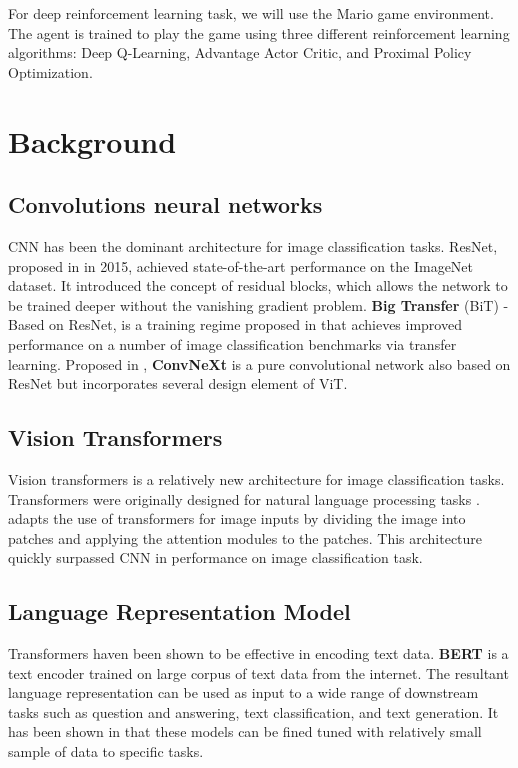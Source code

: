 \documentclass[conference]{IEEEtran}
\begin{document}
For deep reinforcement learning task, we will use the Mario game environment. The agent is trained to play the game using three different reinforcement learning algorithms: Deep Q-Learning, Advantage Actor Critic, and Proximal Policy Optimization.

\section{Background}

\subsection{Convolutions neural networks}

CNN has been the dominant architecture for image classification tasks. ResNet, proposed in \cite{heDeepResidualLearning2015} in 2015, achieved state-of-the-art performance on the ImageNet dataset. It introduced the concept of residual blocks, which allows the network to be trained deeper without the vanishing gradient problem. \textbf{Big Transfer} (BiT) - Based on ResNet\cite{heDeepResidualLearning2015}, is a training regime proposed in \cite{kolesnikovBigTransferBiT2020} that achieves improved performance on a number of image classification benchmarks via transfer learning. Proposed in \cite{liuConvNet2020s2022}, \textbf{ConvNeXt} is a pure convolutional network also based on ResNet but incorporates several design element of ViT.

\subsection{Vision Transformers}

Vision transformers is a relatively new architecture for image classification tasks. Transformers were originally designed for natural language processing tasks \cite{vaswaniAttentionAllYou2023}. \cite{dosovitskiyImageWorth16x162021} adapts the use of transformers for image inputs by dividing the image into patches and applying the attention modules to the patches. This architecture quickly surpassed CNN in performance on image classification task\cite{PapersCodeImageNet}.

\subsection{Language Representation Model}

Transformers \cite{vaswaniAttentionAllYou2023} haven been shown to be effective in encoding text data. \textbf{BERT} \cite{devlinBERTPretrainingDeep2019} is a text encoder trained on large corpus of text data from the internet. The resultant language representation can be used as input to a wide range of downstream tasks such as question and answering, text classification, and text generation. It has been shown in \cite{brownLanguageModelsAre2020} that these models can be fined tuned with relatively small sample of data to specific tasks.
\end{document}
